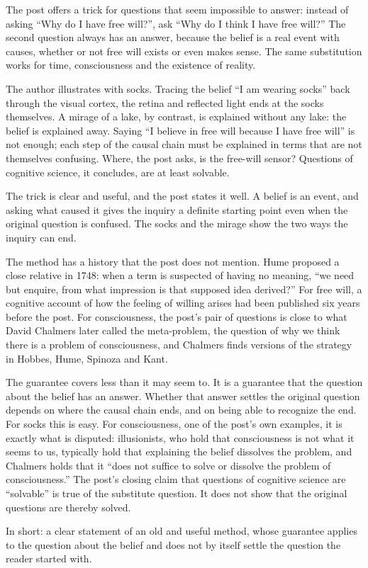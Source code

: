 \begin{afterword}
\summaryhead

The post offers a trick for questions that seem impossible to answer: instead of asking ``Why do I have free will?'', ask ``Why do I think I have free will?'' The second question always has an answer, because the belief is a real event with causes, whether or not free will exists or even makes sense. The same substitution works for time, consciousness and the existence of reality.

The author illustrates with socks. Tracing the belief ``I am wearing socks'' back through the visual cortex, the retina and reflected light ends at the socks themselves. A mirage of a lake, by contrast, is explained without any lake: the belief is explained away. Saying ``I believe in free will because I have free will'' is not enough; each step of the causal chain must be explained in terms that are not themselves confusing. Where, the post asks, is the free-will sensor? Questions of cognitive science, it concludes, are at least solvable.

\responsehead

The trick is clear and useful, and the post states it well. A belief is an event, and asking what caused it gives the inquiry a definite starting point even when the original question is confused. The socks and the mirage show the two ways the inquiry can end.

The method has a history that the post does not mention. Hume proposed a close relative in 1748: when a term is suspected of having no meaning, ``we need but enquire, from what impression is that supposed idea derived?'' For free will, a cognitive account of how the feeling of willing arises had been published six years before the post. For consciousness, the post's pair of questions is close to what David Chalmers later called the meta-problem, the question of why we think there is a problem of consciousness, and Chalmers finds versions of the strategy in Hobbes, Hume, Spinoza and Kant.

The guarantee covers less than it may seem to. It is a guarantee that the question about the belief has an answer. Whether that answer settles the original question depends on where the causal chain ends, and on being able to recognize the end. For socks this is easy. For consciousness, one of the post's own examples, it is exactly what is disputed: illusionists, who hold that consciousness is not what it seems to us, typically hold that explaining the belief dissolves the problem, and Chalmers holds that it ``does not suffice to solve or dissolve the problem of consciousness.'' The post's closing claim that questions of cognitive science are ``solvable'' is true of the substitute question. It does not show that the original questions are thereby solved.

In short: a clear statement of an old and useful method, whose guarantee applies to the question about the belief and does not by itself settle the question the reader started with.
\end{afterword}
